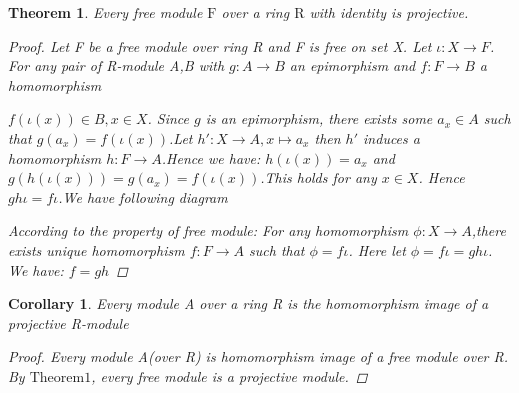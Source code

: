 \documentclass[a4paper]{article}
\newtheorem{myTheo}{Theorem}
\newtheorem{myCol}{Corollary}
\begin{document}
    \begin{myTheo}
        Every free module $\mathrm{F}$ over a ring $\mathrm{R}$ with identity is projective.
        \begin{proof}
            Let F be a free module over ring R and F is free on set X. Let $\iota:X\rightarrow F$.
            For any pair of R-module A,B with $g:A\rightarrow B$ an epimorphism and $f:F\rightarrow B$ a homomorphism\\
        \begin{center}
        \end{center}
        $f(\iota(x))\in B, x\in X$. Since $g$ is an epimorphism, there exists some $a_x\in A$ such that $g(a_x)=f(\iota(x))$.Let
        $h': X\rightarrow A, x\mapsto a_x$ then $h'$ induces a homomorphism $h:F\rightarrow A$.Hence we have: $h(\iota(x))=a_x$ and
        $g(h(\iota(x))) = g(a_x)=f(\iota(x))$.This holds for any $x\in X$. Hence $gh\iota=f\iota$.We have following diagram\\
        \begin{center}
        \end{center}
        According to the property of free module: For any homomorphism $\phi:X\rightarrow A$,there exists unique homomorphism $f:F\rightarrow A$
        such that $\phi=f\iota$. Here let $\phi=f\iota=gh\iota$. We have: $f=gh$
        \end{proof}
    \end{myTheo}

    \begin{myCol}
       Every module A over a ring R is the homomorphism image of a projective R-module 
       \begin{proof}
           Every module A(over R) is homomorphism image of a free module over R. By $\mathrm{Theorem 1}$, every free module is a projective module.
       \end{proof}
    \end{myCol}
\end{document}
